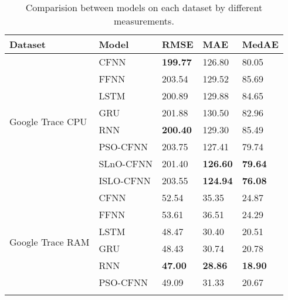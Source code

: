 \documentclass[../main.tex]{subfiles}
\begin{document}
\begin{table}[!t]
\caption{Comparision between models on each dataset by different measurements.}
\label{tbl_result_app}
\centering
\begin{tabular}{|l|l|l|l|l|}
\hline
Dataset                              & Model     & RMSE            & MAE             & MedAE          \\ \hline
\multirow{8}{*}{Google Trace CPU}    & CFNN      & \textbf{199.77} & 126.80          & 80.05          \\ \cline{2-5} 
                                     & FFNN      & 203.54          & 129.52          & 85.69          \\ \cline{2-5} 
                                     & LSTM      & 200.89          & 129.88          & 84.65          \\ \cline{2-5} 
                                     & GRU       & 201.88          & 130.50          & 82.96          \\ \cline{2-5} 
                                     & RNN       & \textbf{200.40} & 129.30          & 85.49          \\ \cline{2-5} 
                                     & PSO-CFNN  & 203.75          & 127.41          & 79.74          \\ \cline{2-5} 
                                     & SLnO-CFNN & 201.40          & \textbf{126.60} & \textbf{79.64} \\ \cline{2-5} 
                                     & ISLO-CFNN & 203.55          & \textbf{124.94} & \textbf{76.08} \\ \hline
\multirow{8}{*}{Google Trace RAM}    & CFNN      & 52.54           & 35.35           & 24.87          \\ \cline{2-5} 
                                     & FFNN      & 53.61           & 36.51           & 24.29          \\ \cline{2-5} 
                                     & LSTM      & 48.47           & 30.40           & 20.51          \\ \cline{2-5} 
                                     & GRU       & 48.43           & 30.74           & 20.78          \\ \cline{2-5} 
                                     & RNN       & \textbf{47.00}  & \textbf{28.86}  & \textbf{18.90} \\ \cline{2-5} 
                                     & PSO-CFNN  & 49.09           & 31.33           & 20.67          \\ \cline{2-5} 

\end{tabular}
\end{table}
\end{document}
